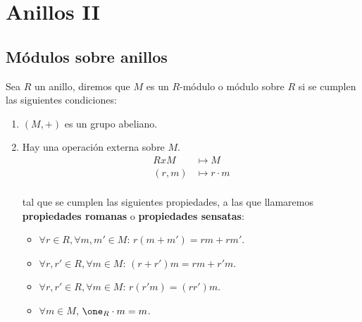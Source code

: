 \chapter{Anillos II}

\section{Módulos sobre anillos}
Sea $R$ un anillo, diremos que $M$ es un $R$-módulo o módulo sobre $R$ si se cumplen las siguientes condiciones:
\begin{enumerate}
	\item $(M,+)$ es un grupo abeliano.
	\item Hay una operación externa sobre $M$.
		\begin{align*}
			RxM & \longmapsto  M \\
			(r,m) & \longmapsto  r\cdot m \\
		\end{align*}

	tal que se cumplen las siguientes propiedades, a las que llamaremos \textbf{propiedades romanas} o \textbf{propiedades sensatas}:
	\begin{itemize}
		\item $\forall r \in R, \forall m,m' \in M$: $r(m+m')=rm+rm'$.
		\item $\forall r,r' \in R, \forall m \in M$: $(r+r')m=rm+r'm$.
		\item $\forall r,r' \in R, \forall m \in M$: $r(r'm)=(rr')m$.
		\item $\forall m \in M$, $\one_R\cdot m = m$.
	\end{itemize}
\end{enumerate}

